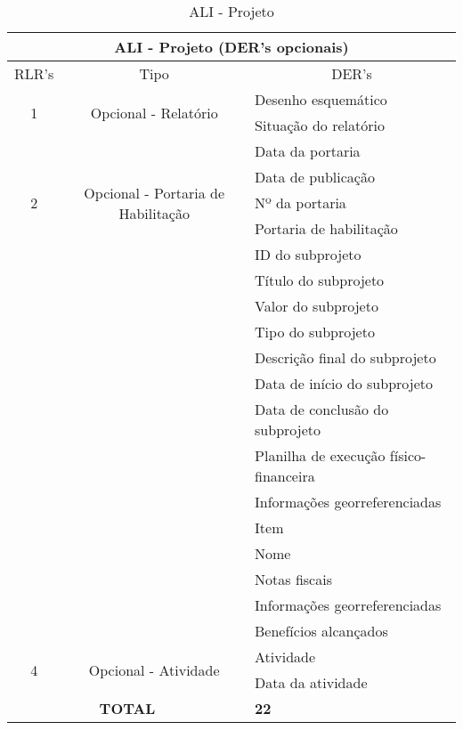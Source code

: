 	  \begin{table}[!h]
	  \centering
	  \caption{ALI - Projeto}
	  \label{ali_projeto}
	  \begin{tabular}{|c|c|l|}
	  \hline
	  \multicolumn{3}{|c|}{\textbf{ALI - Projeto (DER's opcionais)}}                                                      \\ \hline
	  \multicolumn{1}{|l|}{RLR's} & Tipo                         & \multicolumn{1}{c|}{DER's}  \\ \hline
	  \multirow{2}{*}{1}         &\multirow{2}{*}{Opcional - Relatório}    & Desenho esquemático\\ \cline{3-3}
				      &				& Situação do relatório \\ \hline
	  \multirow{5}{*}{2}         &\multirow{5}{*}{Opcional - Portaria de Habilitação}    & Data da portaria   \\ \cline{3-3}   
				      &						& Data de publicação   \\ \cline{3-3} 
				      &						& Nº da portaria      \\ \cline{3-3} 
				      &						& Portaria de habilitação        \\ \hline
	  \multirow{14}{*}{3}         &\multirow{14}{*}{Opcional- Subprojeto}    & ID do subprojeto               \\ \cline{3-3} 
				      &                              & Título do subprojeto             \\ \cline{3-3} 
				      &                              & Valor do subprojeto      \\ \cline{3-3} 
				      &                              & Tipo do subprojeto          \\ \cline{3-3} 
				      &                              & Descrição final do subprojeto          \\ \cline{3-3} 
				      &                              & Data de início do subprojeto                  \\ \cline{3-3} 
				      &                              & Data de conclusão do subprojeto                 \\ \cline{3-3}
				      &				 & Planilha de execução físico-financeira \\ \cline{3-3} 
				      &  				 & Informações georreferenciadas \\ \cline{3-3}         
				      &				 & Item \\ \cline{3-3} 
				      &  				 & Nome \\ \cline{3-3}
				      &				 & Notas fiscais \\ \cline{3-3} 
				      &  				 & Informações georreferenciadas \\ \cline{3-3}         
				      &                              & Benefícios alcançados    \\ \hline
		\multirow{2}{*}{4}         &\multirow{2}{*}{Opcional - Atividade}    & Atividade \\ \cline{3-3}
				      &				& Data da atividade \\ \hline
	  \multicolumn{2}{|c|}{\textbf{TOTAL}} & \textbf{22} \\ \hline
	  \end{tabular}
	  \end{table}
      

